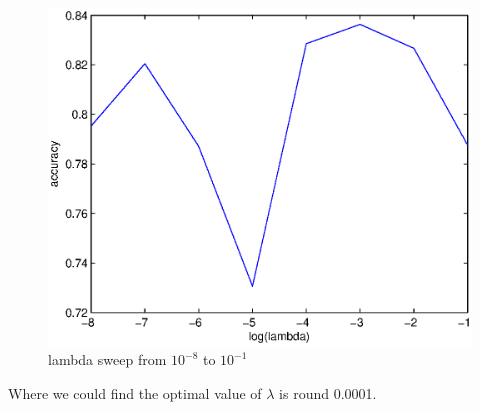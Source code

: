\documentclass[12pt]{article}
\begin{document}
	\begin{figure}[!htb]
		\centering
		\includegraphics[scale=.7]{lambda_n8to0}
		\caption{lambda sweep from $10^{-8}$ to $10^{-1}$}
		\label{fig:lambdaLargeSweep}
	\end{figure}
	\noindent
	Where we could find the optimal value of $\lambda$ is round 0.0001.\\
\end{document}
